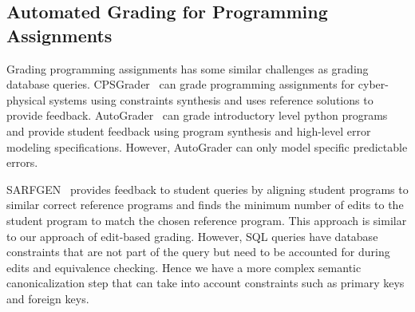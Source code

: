 \subsection*{Automated Grading for Programming Assignments}
Grading programming assignments has some similar challenges as grading database queries. CPSGrader~\cite{cpsgrader} can grade programming assignments for cyber-physical systems using constraints synthesis and uses reference solutions to provide feedback. AutoGrader~\cite{autograder} can grade introductory level python programs and provide student feedback using program synthesis and high-level error modeling specifications. However, AutoGrader can only model specific predictable errors. 

SARFGEN~\cite{sarfgen} provides feedback to student queries by aligning student programs to similar correct reference programs and finds the minimum number of edits to the student program to match the chosen reference program.  This approach is similar to our approach of edit-based grading. However, SQL queries have database constraints that are not part of the query but need to be accounted for during edits and equivalence checking. Hence we have a more complex semantic canonicalization step that can take into account constraints such as primary keys and foreign keys.



